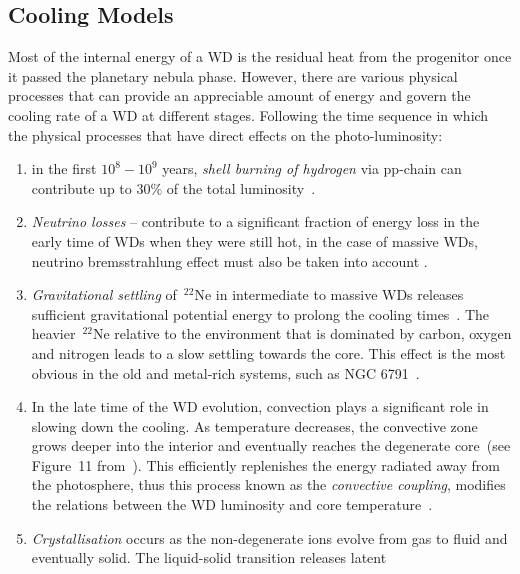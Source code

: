 \documentclass[fleqn,usenatbib]{rasti}
\begin{document}
\subsection{Cooling Models}
\label{sec:cooling_models}
Most of the internal energy of a WD is the residual heat from the progenitor
once it passed the planetary nebula phase. However, there are various physical
processes that can provide an appreciable amount of energy and govern the
cooling rate of a WD at different stages. Following the time sequence in which
the physical processes that have direct effects on the photo-luminosity:
\begin{enumerate}
    \item in the first $10^8-10^9$ years, \textit{shell burning of hydrogen} via pp-chain can contribute up to $30\%$ of the total luminosity~\citep{2010ApJ...717..183R}.
    \item \textit{Neutrino losses} -- contribute to a significant fraction of energy loss in the early time of WDs when they were still hot, in the case of massive WDs, neutrino bremsstrahlung effect must also be taken into account \citep{1994ApJ...425..222H, 1996ApJS..102..411I}.
    \item \textit{Gravitational
settling} of\ $^{22}$Ne in intermediate to massive WDs releases sufficient
gravitational potential energy to prolong the cooling
times~\citep{2002ApJ...580.1077D, 2008ApJ...677..473G, 2010ApJ...719..612A}.
The heavier\ $^{22}$Ne relative to the environment that is dominated by carbon,
oxygen and nitrogen leads to a slow settling towards the core. This effect is
the most obvious in the old and metal-rich systems, such as NGC
6791~\citep{2010Natur.465..194G, 2008ApJ...678.1279B}.
    \item In the late time of
the WD evolution, convection plays a significant role in slowing down the
cooling. As temperature decreases, the convective zone grows deeper into the
interior and eventually reaches the degenerate core~(see Figure~11
from~\citealt{2010A&ARv..18..471A}). This efficiently replenishes the energy
radiated away from the photosphere, thus this process known as the
\textit{convective coupling}, modifies the relations between the WD luminosity
and core temperature~\citep{1989ApJ...347..934D, 2001PASP..113..409F}.
    \item \textit{Crystallisation} occurs as the non-degenerate ions evolve from gas
to fluid and eventually solid. The liquid-solid transition releases latent

\end{enumerate}
\end{document}
